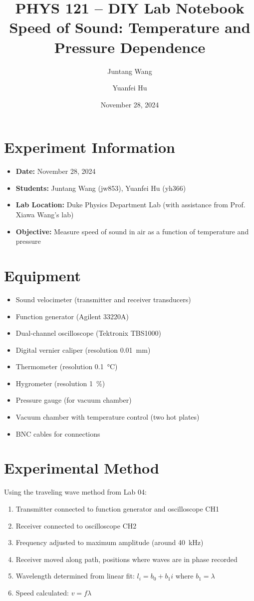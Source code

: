 \documentclass[12pt]{article}
\title{PHYS 121 -- DIY Lab Notebook\\Speed of Sound: Temperature and Pressure Dependence}
\author{Juntang Wang \and Yuanfei Hu}
\date{November 28, 2024}
\begin{document}
\maketitle

\section{Experiment Information}

\begin{itemize}
    \item \textbf{Date:} November 28, 2024
    \item \textbf{Students:} Juntang Wang (jw853), Yuanfei Hu (yh366)
    \item \textbf{Lab Location:} Duke Physics Department Lab (with assistance from Prof. Xiawa Wang's lab)
    \item \textbf{Objective:} Measure speed of sound in air as a function of temperature and pressure
\end{itemize}

\section{Equipment}

\begin{itemize}
    \item Sound velocimeter (transmitter and receiver transducers)
    \item Function generator (Agilent 33220A)
    \item Dual-channel oscilloscope (Tektronix TBS1000)
    \item Digital vernier caliper (resolution \SI{0.01}{\milli\meter})
    \item Thermometer (resolution \SI{0.1}{\celsius})
    \item Hygrometer (resolution \SI{1}{\percent})
    \item Pressure gauge (for vacuum chamber)
    \item Vacuum chamber with temperature control (two hot plates)
    \item BNC cables for connections
\end{itemize}

\section{Experimental Method}

Using the traveling wave method from Lab 04:
\begin{enumerate}
    \item Transmitter connected to function generator and oscilloscope CH1
    \item Receiver connected to oscilloscope CH2
    \item Frequency adjusted to maximum amplitude (around \SI{40}{\kilo\hertz})
    \item Receiver moved along path, positions where waves are in phase recorded
    \item Wavelength determined from linear fit: $l_i = b_0 + b_1 i$ where $b_1 = \lambda$
    \item Speed calculated: $v = f\lambda$
\end{enumerate}
\end{document}
